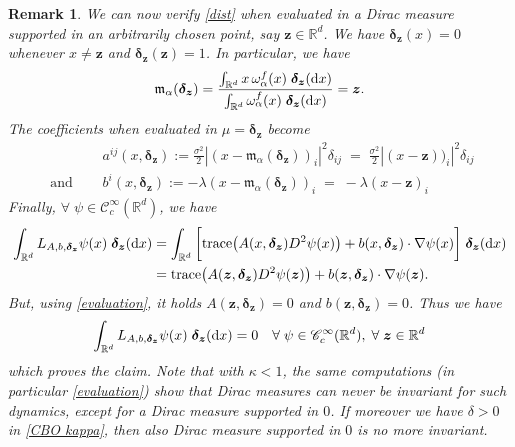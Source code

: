 \documentclass[12pt]{amsart}
\newcommand{\D}[1]{\mbox{\rm #1}}
\newcommand{\dd}{\D{d}}
\numberwithin{equation}{section}
\newtheorem{remark}[theorem]{Remark}
\begin{document}
\begin{remark}
    We can now verify \eqref{dist} when evaluated in a Dirac measure supported in an arbitrarily chosen point, say $\bm{z}\in \mathbb{R}^{d}$. We have $\bm{\delta_{z}}(x) = 0$ whenever $x\neq \bm{z}$ and $\bm{\delta_{z}}(\bm{z}) = 1$. In particular, we have
    \begin{align*}
        \mathfrak{m}_{\alpha}(\bm{\delta_{z}}) = \frac{
        \int_{\mathbb{R}^d} x \, \omega_{\alpha}^{f}(x)\; \bm{\delta_{z}}(\dd x)}{\int_{\mathbb{R}^d}\omega_{\alpha}^{f}(x)\; \bm{\delta_{z}}(\dd x)} = \bm{z}.
    \end{align*}
    The coefficients when evaluated in $\mu = \bm{\delta_{z}}$ become
    \begin{equation}\label{evaluation}
    \begin{aligned}
    	& a^{ij}(x,\bm{\delta_{z}}):=\frac{\sigma^2}{2}|(x-\mathfrak{m}_{\alpha}(\bm{\delta_{z}}))_i|^2\delta_{ij}  \; = \; \frac{\sigma^2}{2}|(x- \bm{z}))_i|^2\delta_{ij}  \\
        \mbox{ and }\quad  & b^i(x,\bm{\delta_{z}}):=- \lambda(x-\mathfrak{m}_{\alpha}(\bm{\delta_{z}}))_i \; = \; - \lambda(x-\bm{z})_i
    \end{aligned}
    \end{equation}
    Finally, $\forall \; \psi \in \mathscr{C}_c^\infty (\mathbb{R}^d)$, we have
    \begin{align*}
        \int_{\mathbb{R}^d} L_{A,b,\bm{\delta_{z}}}\psi(x)\; \bm{\delta_{z}}(\dd x)  & =  \int_{\mathbb{R}^d} \bigg[\text{trace}\big(A(x,\bm{\delta_{z}})D^2\psi(x)\big) + 
        b(x,\bm{\delta_{z}}) \cdot \nabla\psi(x)\bigg]\; \bm{\delta_{z}}(\dd x) \\
        & =   \text{trace}\big(A(\bm{z},\bm{\delta_{z}})D^2\psi(\bm{z})\big) + 
        b(\bm{z},\bm{\delta_{z}}) \cdot \nabla\psi(\bm{z}). 
    \end{align*}
    But, using \eqref{evaluation}, it holds $A(\bm{z},\bm{\delta_{z}}) = 0$ and $b(\bm{z},\bm{\delta_{z}}) = 0$. Thus we have 
    \begin{equation*}
        \int_{\mathbb{R}^d} L_{A,b,\bm{\delta_{z}}}\psi(x)\; \bm{\delta_{z}}(\dd x) = 0 \quad \forall \; \psi \in \mathscr{C}_c^\infty (\mathbb{R}^d), \; \forall \; \bm{z} \in \mathbb{R}^{d}
    \end{equation*}
    which proves the claim. Note that with $\kappa <1$, the same computations (in particular \eqref{evaluation}) show that Dirac measures can never be invariant for such dynamics, except for a Dirac measure supported in $0$. If moreover we have $\delta >0$ in \eqref{CBO kappa}, then also Dirac measure supported in $0$ is no more invariant. 
\end{remark}
\end{document}

